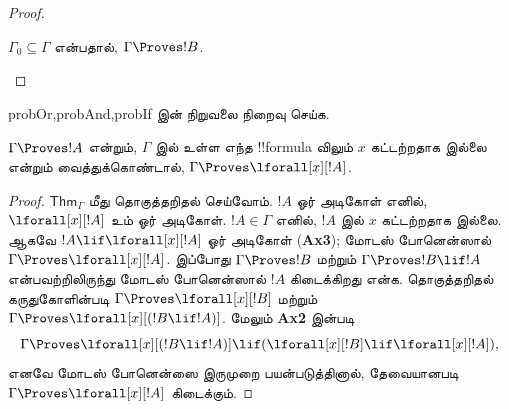 \documentclass[11pt,a4paper,openany]{memoir}
\begin{document}
\begin{proof}
\begin{enumerate}
{{%
$\Gamma_0 \subseteq \Gamma$ என்பதால், $\Gamma \Proves !B$.}}


\end{enumerate}
\end{proof}

\begin{probtag}{probOr,probAnd,probIf} 
இன் நிறுவலை நிறைவு செய்க.
\end{probtag}

\begin{thm}[பொதுமைப்படுத்தல்] 
$\Gamma \Proves !A$ என்றும், $\Gamma$ இல் உள்ள எந்த !!{formula} விலும்
$x$ கட்டற்றதாக இல்லை என்றும் வைத்துக்கொண்டால், $\Gamma
\Proves \lforall[x][!A]$.
\end{thm}

\begin{proof} $\mathsf{Thm}_\Gamma$ மீது தொகுத்தறிதல் செய்வோம். $!A$
ஓர் அடிகோள் எனில், $\lforall[x][!A]$ உம் ஓர் அடிகோள். $!A\in \Gamma$
எனில், $!A$ இல் $x$ கட்டற்றதாக இல்லை. ஆகவே $!A \lif
\lforall[x][!A]$ ஓர் அடிகோள் (\textbf{Ax3}); மோடஸ் போனென்ஸால்
$\Gamma \Proves \lforall[x][!A]$. இப்போது $\Gamma \Proves !B$ மற்றும்
$\Gamma \Proves !B \lif !A$ என்பவற்றிலிருந்து மோடஸ் போனென்ஸால் $!A$
கிடைக்கிறது என்க. தொகுத்தறிதல் கருதுகோளின்படி $\Gamma \Proves
\lforall[x][!B]$ மற்றும் $\Gamma \Proves \lforall[x][( !B \lif
!A)]$. மேலும் \textbf{Ax2} இன்படி
\[ \Gamma \Proves
\lforall[x][( !B \lif !A)] \lif (\lforall[x][ !B] \lif \lforall[x][!A]), \]
எனவே மோடஸ் போனென்ஸை இருமுறை பயன்படுத்தினால், தேவையானபடி
$\Gamma \Proves \lforall[x][!A]$ கிடைக்கும்.
\end{proof}
\end{document}
